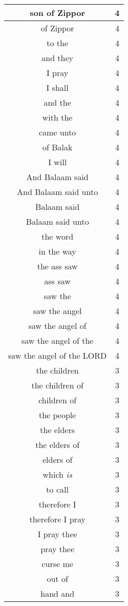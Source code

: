 \begin{center}
\begin{longtable}{|c|c|}
son of Zippor & 4\\ \hline 
of Zippor & 4\\ \hline 
to the & 4\\ \hline 
and they & 4\\ \hline 
I pray & 4\\ \hline 
I shall & 4\\ \hline 
and the & 4\\ \hline 
with the & 4\\ \hline 
came unto & 4\\ \hline 
of Balak & 4\\ \hline 
I will & 4\\ \hline 
And Balaam said & 4\\ \hline 
And Balaam said unto & 4\\ \hline 
Balaam said & 4\\ \hline 
Balaam said unto & 4\\ \hline 
the word & 4\\ \hline 
in the way & 4\\ \hline 
the ass saw & 4\\ \hline 
ass saw & 4\\ \hline 
saw the & 4\\ \hline 
saw the angel & 4\\ \hline 
saw the angel of & 4\\ \hline 
saw the angel of the & 4\\ \hline 
saw the angel of the LORD & 4\\ \hline 
the children & 3\\ \hline 
the children of & 3\\ \hline 
children of & 3\\ \hline 
the people & 3\\ \hline 
the elders & 3\\ \hline 
the elders of & 3\\ \hline 
elders of & 3\\ \hline 
which \emph{is} & 3\\ \hline 
to call & 3\\ \hline 
therefore I & 3\\ \hline 
therefore I pray & 3\\ \hline 
I pray thee & 3\\ \hline 
pray thee & 3\\ \hline 
curse me & 3\\ \hline 
out of & 3\\ \hline 
hand and & 3\\ \hline 

\end{longtable}
\end{center}
